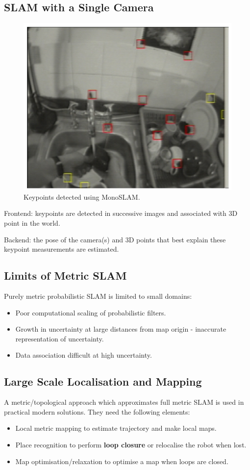\documentclass[11pt]{article}
\begin{document}
\subsection{SLAM with a Single Camera}
\begin{figure}[h]
  \caption{Keypoints detected using MonoSLAM.}
  \includegraphics[scale=0.4]{monoslam}
  \centering
\end{figure}
Frontend: keypoints are detected in successive images and associated with 3D point in the world.

Backend: the pose of the camera(s) and 3D points that best explain these keypoint measurements are estimated.

\subsection{Limits of Metric SLAM}
Purely metric probabilistic SLAM is limited to small domains:
\begin{itemize}
  \item Poor computational scaling of probabilistic filters.
  \item Growth in uncertainty at large distances from map origin - inaccurate representation of uncertainty.
  \item Data association difficult at high uncertainty.
\end{itemize}

\subsection{Large Scale Localisation and Mapping}
A metric/topological approach which approximates full metric SLAM is used in practical modern solutions.
They need the following elements:
\begin{itemize}
  \item Local metric mapping to estimate trajectory and make local maps.
  \item Place recognition to perform \textbf{loop closure} or relocalise the robot when lost.
  \item Map optimisation/relaxation to optimise a map when loops are closed.
\end{itemize}
\end{document}

